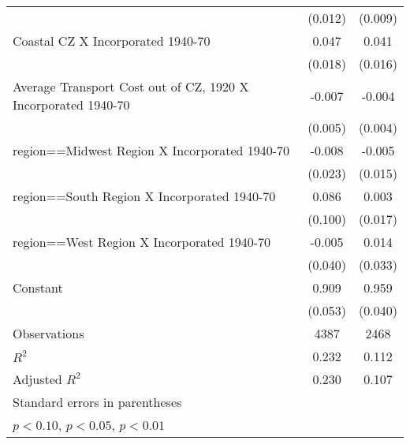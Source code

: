 \begin{table}[htbp]
\begin{tabular}{l*{2}{c}}
                    &     (0.012)         &     (0.009)         \\
[1em]
Coastal CZ X Incorporated 1940-70&       0.047\sym{***}&       0.041\sym{***}\\
                    &     (0.018)         &     (0.016)         \\
[1em]
Average Transport Cost out of CZ, 1920 X Incorporated 1940-70&      -0.007         &      -0.004         \\
                    &     (0.005)         &     (0.004)         \\
[1em]
region==Midwest Region X Incorporated 1940-70&      -0.008         &      -0.005         \\
                    &     (0.023)         &     (0.015)         \\
[1em]
region==South Region X Incorporated 1940-70&       0.086         &       0.003         \\
                    &     (0.100)         &     (0.017)         \\
[1em]
region==West Region X Incorporated 1940-70&      -0.005         &       0.014         \\
                    &     (0.040)         &     (0.033)         \\
[1em]
Constant            &       0.909\sym{***}&       0.959\sym{***}\\
                    &     (0.053)         &     (0.040)         \\
\hline
Observations        &        4387         &        2468         \\
\(R^{2}\)           &       0.232         &       0.112         \\
Adjusted \(R^{2}\)  &       0.230         &       0.107         \\
\hline\hline
\multicolumn{3}{l}{\footnotesize Standard errors in parentheses}\\
\multicolumn{3}{l}{\footnotesize \sym{*} \(p<0.10\), \sym{**} \(p<0.05\), \sym{***} \(p<0.01\)}\\
\end{tabular}
\end{table}
